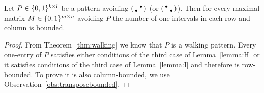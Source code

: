 \begin{lemma}
\label{lemma:walkpat}
Let $P\in\{0,1\}^{k\times l}$ be a pattern avoiding $\left(\begin{smallmatrix} &\bullet\\\bullet& \end{smallmatrix}\right)$ (or $\left(\begin{smallmatrix}\bullet& \\ &\bullet\end{smallmatrix}\right)$). Then for every maximal matrix $M\in\{0,1\}^{m\times n}$ avoiding $P$ the number of one-intervals in each row and column is bounded.
\end{lemma}
\begin{proof}
From Theorem~\ref{thm:walking} we know that $P$ is a walking pattern. Every one-entry of $P$ satisfies either conditions of the third case of Lemma~\ref{lemma:H} or it satisfies conditions of the third case of Lemma~\ref{lemma:I} and therefore is row-bounded. To prove it is also column-bounded, we use Observation~\ref{obs:transposebounded}.
\end{proof}

